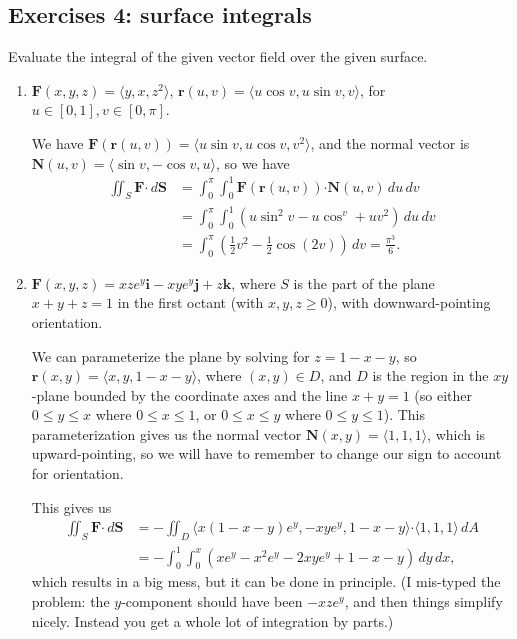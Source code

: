 \documentclass[12pt,letterpaper]{article}
\newcommand{\dotp}{\boldsymbol{\cdot}}
\renewcommand{\S}{\mathbf{S}}
\renewcommand{\r}{\mathbf{r}}
\newcommand{\F}{\mathbf{F}}
\renewcommand{\i}{\mathbf{i}}
\renewcommand{\j}{\mathbf{j}}
\renewcommand{\k}{\mathbf{k}}
\newcommand{\N}{\mathbf{N}}
\begin{document}
\subsection{Exercises 4: surface integrals}
Evaluate the integral of the given vector field over the given surface.
\begin{enumerate}
 \item $\F(x,y,z) = \langle y, x, z^2\rangle$, $\r(u,v) = \langle u\cos v, u\sin v, v\rangle$, for $u\in [0,1], v\in [0,\pi]$.

\bigskip

We have $\F(\r(u,v)) = \langle u\sin v, u\cos v, v^2\rangle$, and the normal vector is $\N(u,v) = \langle \sin v, -\cos v, u\rangle$, so we have
\begin{align*}
 \iint_S\F\dotp\,d\S & = \int_0^{\pi}\int_0^1 \F(\r(u,v))\dotp\N(u,v)\,du\,dv\\
& = \int_0^\pi\int_0^1 (u\sin^2v-u\cos^v+uv^2)\,du\,dv\\
& = \int_0^{\pi}(\frac{1}{2}v^2-\frac{1}{2}\cos(2v))\,dv = \frac{\pi^3}{6}.
\end{align*}

 \item $\F(x,y,z) = xze^y\i-xye^y\j +z\k$, where $S$ is the part of the plane $x+y+z=1$ in the first octant (with $x,y,z\geq 0$), with downward-pointing orientation.

\bigskip

We can parameterize the plane by solving for $z=1-x-y$, so $\r(x,y) = \langle x, y, 1-x-y\rangle$, where $(x,y)\in D$, and $D$ is the region in the $xy$-plane bounded by the coordinate axes and the line $x+y=1$ (so either $0\leq y\leq x$ where $0\leq x\leq 1$, or $0\leq x\leq y$ where $0\leq y\leq 1$). This parameterization gives us the normal vector $\N(x,y) = \langle 1, 1, 1\rangle$, which is upward-pointing, so we will have to remember to change our sign to account for orientation.

This gives us
\begin{align*}
 \iint_S\F\dotp\,d\S & = -\iint_D\langle x(1-x-y)e^y, -xye^y, 1-x-y\rangle\dotp \langle 1, 1, 1\rangle\,dA\\
 & = -\int_0^1\int_0^x(xe^y-x^2e^y-2xye^y+1-x-y)\,dy\,dx,
\end{align*}
which results in a big mess, but it can be done in principle. (I mis-typed the problem: the $y$-component should have been $-xze^y$, and then things simplify nicely. Instead you get a whole lot of integration by parts.)





\end{enumerate}
\end{document}

